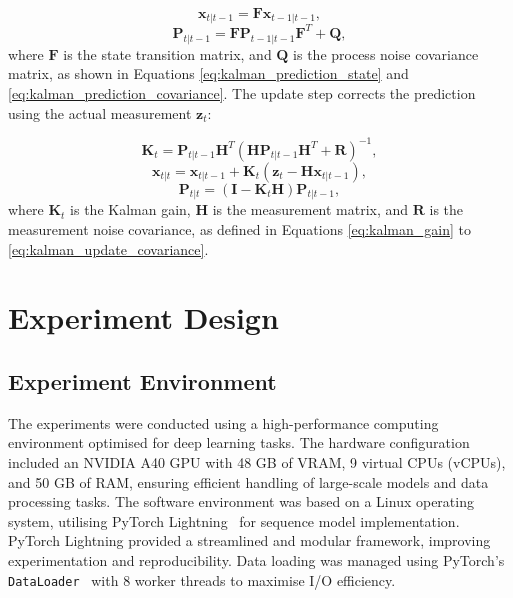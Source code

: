 \documentclass[12pt,oneside]{book} %
\begin{document}
\begin{equation}
    \mathbf{x}_{t|t-1} = \mathbf{F} \mathbf{x}_{t-1|t-1}, \label{eq:kalman_prediction_state}
\end{equation}
\begin{equation}
    \mathbf{P}_{t|t-1} = \mathbf{F} \mathbf{P}_{t-1|t-1} \mathbf{F}^T + \mathbf{Q}, \label{eq:kalman_prediction_covariance}
\end{equation}
where $\mathbf{F}$ is the state transition matrix, and $\mathbf{Q}$ is the process noise covariance matrix, as shown in Equations \eqref{eq:kalman_prediction_state} and \eqref{eq:kalman_prediction_covariance}. The update step corrects the prediction using the actual measurement $\mathbf{z}_t$:

\begin{equation}
    \mathbf{K}_t = \mathbf{P}_{t|t-1} \mathbf{H}^T (\mathbf{H} \mathbf{P}_{t|t-1} \mathbf{H}^T + \mathbf{R})^{-1}, \label{eq:kalman_gain}
\end{equation}
\begin{equation}
    \mathbf{x}_{t|t} = \mathbf{x}_{t|t-1} + \mathbf{K}_t (\mathbf{z}_t - \mathbf{H} \mathbf{x}_{t|t-1}), \label{eq:kalman_update_state}
\end{equation}
\begin{equation}
    \mathbf{P}_{t|t} = (\mathbf{I} - \mathbf{K}_t \mathbf{H}) \mathbf{P}_{t|t-1}, \label{eq:kalman_update_covariance}
\end{equation}
where $\mathbf{K}_t$ is the Kalman gain, $\mathbf{H}$ is the measurement matrix, and $\mathbf{R}$ is the measurement noise covariance, as defined in Equations \eqref{eq:kalman_gain} to \eqref{eq:kalman_update_covariance}.

\chapter{Experiment Design}\label{chap:experiment_design}
\section{Experiment Environment}
The experiments were conducted using a high-performance computing environment
optimised for deep learning tasks. The hardware configuration included an
NVIDIA A40 GPU with 48 GB of VRAM, 9 virtual CPUs (vCPUs), and 50 GB of RAM,
ensuring efficient handling of large-scale models and data processing tasks.
The software environment was based on a Linux operating system, utilising
PyTorch Lightning~\cite{Falcon_PyTorch_Lightning_2019} for sequence model
implementation. PyTorch Lightning provided a streamlined and modular framework,
improving experimentation and reproducibility. Data loading was managed using
PyTorch's \texttt{DataLoader}~\cite{Ansel_PyTorch_2_Faster_2024} with 8 worker
threads to maximise I/O efficiency. 
\end{document}
